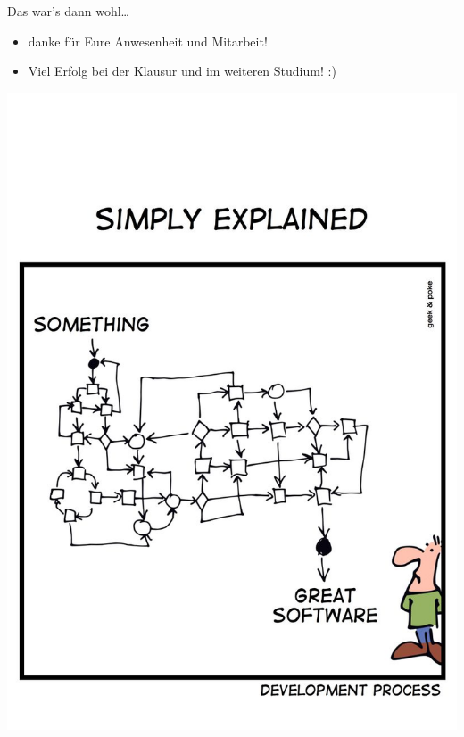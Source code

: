\documentclass[18pt]{beamer}
\begin{document}
	\begin{frame}{Das war's dann wohl\dots}
		\begin{itemize}
			\item danke für Eure Anwesenheit und Mitarbeit!
			\item Viel Erfolg bei der Klausur und im weiteren Studium! :)
		\end{itemize}
	\end{frame}

	\begin{frame}
		\centering

		\includegraphics[scale=0.9]{./comics/geek_and_poke_development2.jpg}
	\end{frame}
\end{document}
